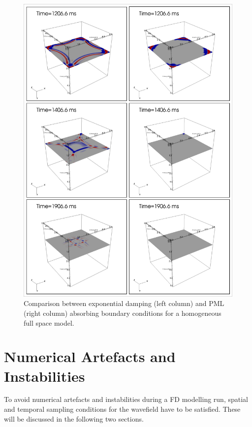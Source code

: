 \begin{enumerate}
\begin{figure}[ht]
\begin{center}
\includegraphics[width=13cm]{figures/ABS_PML_comp_shots.pdf}
\caption{\label{comp_EXP_PML} Comparison between exponential damping (left column) and PML (right column) absorbing boundary conditions for a homogeneous full space model.}
\end{center}
\end{figure} 
\end{enumerate} 
\clearpage
\section{Numerical Artefacts and Instabilities}\label{num_instab}
To avoid numerical artefacts and instabilities during a FD modelling run, spatial and temporal sampling conditions for the wavefield 
have to be satisfied. These will be discussed in the following two sections. 
